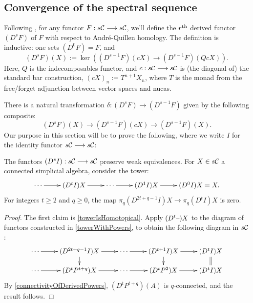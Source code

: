 \documentclass[10pt]{article}
\newcommand{\Comm}{\calC}
\begin{document}
\begin{convergenceOLD}
\subsection{Convergence of the spectral sequence}
Following \cite{BousKanSSeq.pdf}, for any functor $F:s\Comm\to s\Comm$, we'll define the $r^\textup{th}$ derived functor $(D^sF)$ of $F$ with respect to Andr\'e-Quillen homology. The definition is inductive: one sets $(D^0F)=F$, and
\[(D^sF)(X):=\ker((D^{s-1}F)(cX)\to (D^{s-1}F)(QcX)).\]
Here, $Q$ is the indecomposables functor, and $c:s\Comm\to s\Comm$ is (the diagonal of) the standard bar construction, $(cX)_n:=T^{n+1}X_n$, where $T$ is the monad from the free/forget adjunction between vector spaces and nucas.

There is a natural transformation $\delta:(D^sF)\to (D^{s-1}F)$ given by the following composite:
\[(D^sF)(X)\to (D^{s-1}F)(cX)\to (D^{s-1}F)(X).\]
Our purpose in this section will be to prove the following, where we write $I$ for the identity functor $s\Comm\to s\Comm$:
\begin{prop}\label{convergenceProp}
The functors $(D^sI):s\Comm\to s\Comm$ preserve weak equivalences.
For $X\in s\Comm$ a connected simplicial algebra, consider the tower:
\[\xymatrix@R=4mm{
\cdots 
\ar[r]
&%
(D^{t}I)X
\ar[r]
&%
\cdots \ar[r]
&%
(D^1I)X
\ar[r]&%
(D^0I)X=X.
}\]
For integers $t\geq2$ and $q\geq0$, the map $\pi_q(D^{2t+q-1}I)X\to\pi_q(D^{t}I)X$ is zero.
\end{prop}
\begin{proof}%
The first claim is \ref{towerIsHomotopical}. Apply $(D^t\textup{--})X$ to the diagram of functors constructed in \ref{towerWithPowers}, to obtain the following diagram in $s\Comm$:
\[\xymatrix@R=4mm{
\cdots 
\ar[r]
&%
(D^{2t+q-1}I)X
\ar[r]
\ar[d]
&
\cdots \ar[r]
&%
(D^{t+1}I)X
\ar[r]
\ar[d]&%
(D^tI)X
\ar@{=}[d]
\\%
\cdots
\ar[r]
&%
(D^tP^{t+q})X
\ar[r]
&%
\cdots 
\ar[r]&%
(D^tP^2)X
\ar[r]
&%
(D^tI)X%
}\]
By \ref{connectivityOfDerivedPowers}, $(D^tP^{t+q})(A)$ is $q$-connected, and the result follows.
\end{proof}



\end{convergenceOLD}
\end{document}
